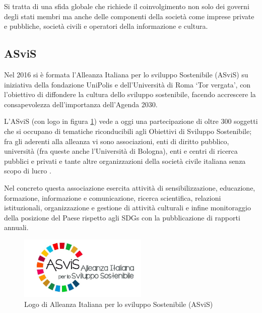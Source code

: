 Si tratta di una sfida globale che richiede il coinvolgimento non solo dei governi degli stati membri ma anche delle componenti della società come imprese private e pubbliche, società civili e operatori della informazione e cultura.

\subsection{ASviS}
Nel 2016 si è formata l'Alleanza Italiana per lo sviluppo Sostenibile (ASviS) \cite{asvis} su iniziativa della fondazione UniPolis e dell'Università di Roma \enquote*{Tor vergata}, con l'obiettivo di diffondere la cultura dello sviluppo sostenibile, facendo accrescere la consapevolezza dell'importanza dell'Agenda 2030. 

L'ASviS (con logo in figura \ref{fig:asvis-logo}) vede a oggi una partecipazione di oltre 300 soggetti che si occupano di tematiche riconducibili agli Obiettivi di Sviluppo Sostenibile; fra gli aderenti alla alleanza vi sono associazioni, enti di diritto pubblico, università (fra queste anche l'Università di Bologna), enti e centri di ricerca pubblici e privati e tante altre organizzazioni della società civile italiana senza scopo di lucro \cite{aderenti_asvis}.

Nel concreto questa associazione esercita attività di sensibilizzazione, educazione, formazione, informazione e comunicazione, ricerca scientifica, relazioni istituzionali, organizzazione e gestione di attività culturali e infine monitoraggio della posizione del Paese rispetto agli SDGs con la pubblicazione di rapporti annuali.

\begin{figure}
    \center
    \includegraphics[height=3cm]{img/Logo-ASviS.jpg}
    \caption{Logo di Alleanza Italiana per lo sviluppo Sostenibile (ASviS) \cite{asvis}}
    \label{fig:asvis-logo}
\end{figure}
%
